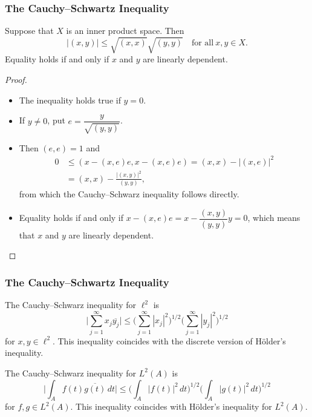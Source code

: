 \documentclass[handout]{beamer}
\theoremstyle{remark}
\begin{document}
\begin{frame}[shrink=25]\frametitle{The Cauchy--Schwartz Inequality}

\begin{theorem}
Suppose that $X$ is an inner product space. Then
$$|(x,y)|\le\sqrt{(x,x)}\sqrt{(y,y)}\quad\mbox{for all}\ x,y\in X.$$
Equality holds if and only if $x$ and $y$ are linearly dependent.
\end{theorem}

\begin{proof}
\begin{itemize}
\item The inequality holds true if $y=0$.
\item If $y\neq0$, put $e=\dfrac{y}{\sqrt{(y,y)}}$.
\item Then $(e,e)=1$ and
\begin{align*}
0&\le(x-(x,e)e,x-(x,e)e)=(x,x)-|(x,e)|^2\\
&=(x,x)-\frac{|(x,y)|^2}{(y,y)},
\end{align*}
from which the Cauchy--Schwarz inequality follows directly.
\item Equality holds if and only
if $x-(x,e)e=x-\dfrac{(x,y)}{(y,y)}y=0$, which means that $x$ and $y$ are linearly dependent.\qedhere
\end{itemize}
\end{proof}

\end{frame}

\begin{frame}[shrink=15]\frametitle{The Cauchy--Schwartz Inequality}

\begin{example}
The Cauchy--Schwarz inequality for $\ell^2$ is
$$\biggl|\sum^\infty_{j=1}x_j\overline{y_j}\biggr|
\le\biggl(\sum^\infty_{j=1}|x_j|^2\biggr)^{1/2}
\biggl(\sum^\infty_{j=1}|y_j|^2\biggr)^{1/2}$$
for $x,y\in\ell^2$. This inequality coincides with the discrete version of H\"older's inequality.
\end{example}

\begin{example}
The Cauchy--Schwarz inequality for $L^2(A)$ is
$$\biggl|\int_Af(t)\overline{g(t)}\,dt\biggr|\le\biggl(\int_A|f(t)|^2\,dt\biggr)^{1/2}
\biggl(\int_A|g(t)|^2\,dt\biggr)^{1/2}$$
for $f,g\in L^2(A)$. This inequality coincides with H\"older's inequality for $L^2(A)$.
\end{example}

\end{frame}
\end{document}
